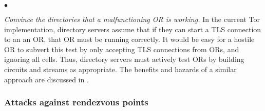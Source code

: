 \documentclass[times,10pt,twocolumn]{article}
\newenvironment{tightlist}{\begin{list}{$\bullet$}{
  \setlength{\itemsep}{0mm}
    \setlength{\parsep}{0mm}
    }}{\end{list}}
\begin{document}
\begin{tightlist}
\item \emph{Convince the directories that a malfunctioning OR is
  working.}  In the current Tor implementation, directory servers
  assume that if they can start a TLS connection to an an OR, that OR
  must be running correctly.  It would be easy for a hostile OR to
  subvert this test by only accepting TLS connections from ORs, and
  ignoring all cells. Thus, directory servers must actively test ORs
  by building circuits and streams as appropriate.  The benefits and
  hazards of a similar approach are discussed in \cite{mix-acc}.
  
\end{tightlist}

\subsubsection*{Attacks against rendezvous points}
\end{document}
